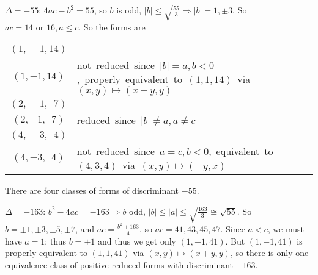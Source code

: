 \documentclass[12pt]{article}
\begin{document}
$\Delta=-55$: $4ac-b^2=55$, so $b$ is odd, $|b|\leq \sqrt{\frac{55}{3}} \Rightarrow |b|=1,\pm 3$. So $ac=14\text{ or }16, a\leq c$. So the forms are
\begin{center}
\begin{tabular}{c l}
$(1,\phantom{-}1,14)$&\\
$(1,-1,14)$&\mbox{\small not reduced since $|b|=a,b<0$, properly equivalent to $(1,1,14)$ via $(x,y)\mapsto (x+y,y)$}\\
$(2,\phantom{-}1,\phantom{1}7)$&\\
$(2,-1,\phantom{1}7)$&\mbox{\small reduced since $|b|\neq a, a\neq c$}\\
$(4,\phantom{-}3,\phantom{1}4)$&\\
$(4,-3,\phantom{1}4)$&\mbox{\small not reduced since $a=c,b<0$, equivalent to $(4,3,4)$ via $(x,y)\mapsto(-y,x)$}
\end{tabular}
\end{center}
There are four classes of forms of discriminant $-55$.

$\Delta=-163$: $b^2-4ac=-163 \Rightarrow b$ odd, $|b|\leq |a|\leq \sqrt{\frac{163}{3}} \cong \sqrt{55}$. So $b=\pm 1, \pm 3,\pm 5,\pm 7$, and $ac=\frac{b^2+163}{4}$, so $ac=41,43,45,47$. Since $a<c$, we must have $a=1$; thus $b=\pm 1$ and thus we get only $(1,\pm 1,41)$. But $(1,-1,41)$ is properly equivalent to $(1,1,41)$ via $(x,y)\mapsto(x+y,y)$, so there is only one equivalence class of positive reduced forms with discriminant $-163$.
\end{document}
